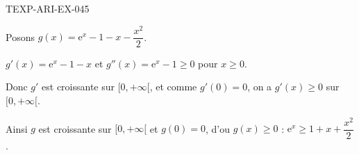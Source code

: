 \begin{corrige}{TEXP-ARI-EX-045}

Posons $g(x) = \mathrm{e}^x - 1 - x - \dfrac{x^2}{2}$.

\commentaireMarge{Étudier $g'' = \mathrm{e}^x - 1 \geq 0$ sur $[0,+\infty[$ pour remonter au signe de $g$.}

$g'(x) = \mathrm{e}^x - 1 - x$ et $g''(x) = \mathrm{e}^x - 1 \geq 0$ pour $x \geq 0$.

Donc $g'$ est croissante sur $[0, +\infty[$, et comme $g'(0) = 0$, on a $g'(x) \geq 0$ sur $[0, +\infty[$.

Ainsi $g$ est croissante sur $[0, +\infty[$ et $g(0) = 0$, d'ou $g(x) \geq 0$ : $\mathrm{e}^x \geq 1 + x + \dfrac{x^2}{2}$.

\end{corrige}
